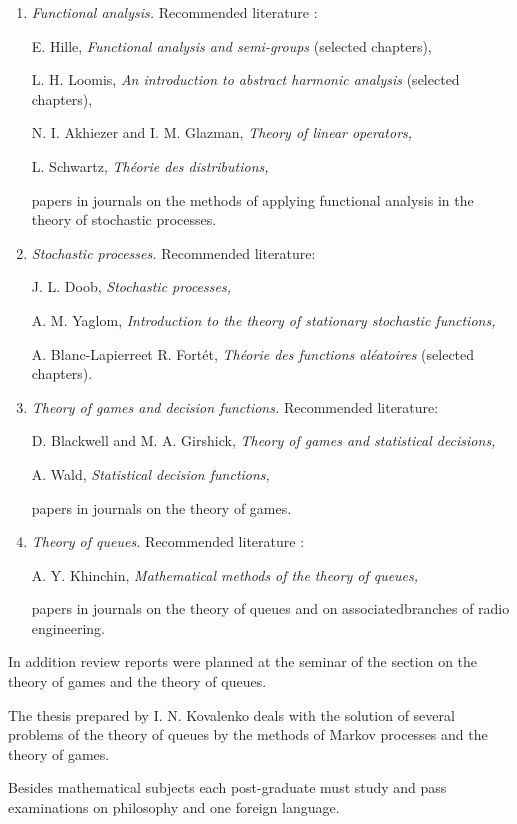 \begin{enumerate}
\item \textit{Functional analysis.} Recommended literature :

E. Hille, \textit{Functional analysis and semi-groups} (selected chapters),

L. H. Loomis, \textit{An introduction to abstract harmonic analysis}
(selected chapters),

N. I. Akhiezer and I. M. Glazman, \textit{Theory of linear operators,}

L. Schwartz, \textit{Th\'eorie des distributions,}

papers in journals on the methods of applying functional analysis in
the theory of stochastic processes.

\item \textit{Stochastic processes.} Recommended literature:

J. L. Doob, \textit{Stochastic processes,}

A. M. Yaglom, \textit{Introduction to the theory of stationary
  stochastic functions,}

A. Blanc-Lapierre\pageoriginale et R. Fort\'et, \textit{Th\'eorie des
  functions al\'eatoires} (selected chapters).

\item \textit{Theory of games and decision functions.} Recommended
  literature:

D. Blackwell and M. A. Girshick, \textit{Theory of games and
  statistical decisions,}

A. Wald, \textit{Statistical decision functions,}

papers in journals on the theory of games.

\item \textit{Theory of queues.} Recommended literature :

A. Y. Khinchin, \textit{Mathematical methods of the theory of queues,}

papers in journals on the theory of queues and on
associated\break branches of radio engineering.
\end{enumerate}

In addition review reports were planned at the seminar of the section
on the theory of games and the theory of queues. 

The thesis prepared by I. N. Kovalenko deals with the solution of
several problems of the theory of queues by the methods of Markov
processes and the theory of games.

Besides mathematical subjects each post-graduate must study and pass
examinations on philosophy and one foreign language. 

